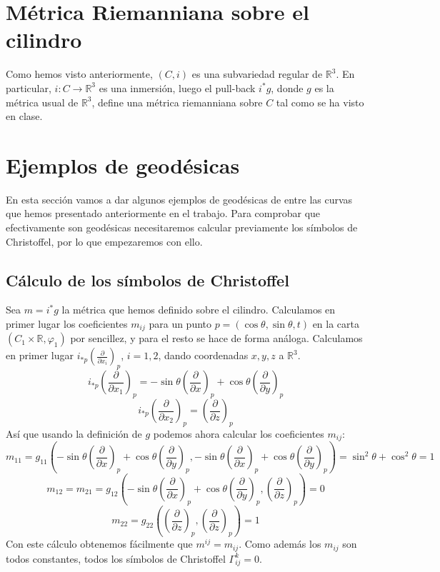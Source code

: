 \documentclass[twoside, 11pt]{article}
\theoremstyle{definition}
\newcommand{\R}{\mathbb{R}}
\newcommand{\parcial}[2]{\frac{\partial #1}{\partial #2}}
\begin{document}
\begin{enumerate}
\end{enumerate}

\section{Métrica Riemanniana sobre el cilindro}

Como hemos visto anteriormente, $(C,i)$ es una subvariedad regular de $\R^3$. En particular, $i:C\to \R^3$ es una inmersión, luego el pull-back $i^*g$, donde $g$ es la métrica usual de $\R^3$, define una métrica riemanniana sobre $C$ tal como se ha visto en clase.


\section{Ejemplos de geodésicas}
En esta sección vamos a dar algunos ejemplos de geodésicas de entre las curvas que hemos presentado anteriormente en el trabajo. Para comprobar que efectivamente son geodésicas necesitaremos calcular previamente los símbolos de Christoffel, por lo que empezaremos con ello.

\subsection{Cálculo de los símbolos de Christoffel}
Sea $m=i^*g$ la métrica que hemos definido sobre el cilindro. Calculamos en primer lugar los coeficientes $m_{ij}$ para un punto $p=(\cos\theta,\sin\theta, t)$ en la carta $(C_1\times\R,\varphi_1)$ por sencillez, y para el resto se hace de forma análoga. Calculamos en primer lugar $i_{*p}\left(\parcial{}{x_i}\right)_p$, $i=1,2$, dando coordenadas $x,y,z$ a $\R^3$.
\[
i_{*p}\left(\parcial{}{x_1}\right)_p= -\sin\theta \left(\parcial{}{x}\right)_p+\cos\theta\left(\parcial{}{y}\right)_p
\]
\[
i_{*p}\left(\parcial{}{x_2}\right)_p= \left(\parcial{}{z}\right)_p
\]
Así que usando la definición de $g$ podemos ahora calcular los coeficientes $m_{ij}$:
\[
m_{11}=g_{11}\left(-\sin\theta \left(\parcial{}{x}\right)_p+\cos\theta\left(\parcial{}{y}\right)_p, -\sin\theta \left(\parcial{}{x}\right)_p+\cos\theta\left(\parcial{}{y}\right)_p\right)=\sin^2\theta+\cos^2\theta=1
\]
\[
m_{12}=m_{21}=g_{12}\left(-\sin\theta \left(\parcial{}{x}\right)_p+\cos\theta\left(\parcial{}{y}\right)_p, \left(\parcial{}{z}\right)_p\right)=0
\]
\[
m_{22}=g_{22}\left(\left(\parcial{}{z}\right)_p,\left(\parcial{}{z}\right)_p\right)=1
\]
Con este cálculo obtenemos fácilmente que $m^{ij}=m_{ij}$. Como además los $m_{ij}$ son todos constantes, todos los símbolos de Christoffel $\Gamma^k_{ij}=0$. 
\end{document}
